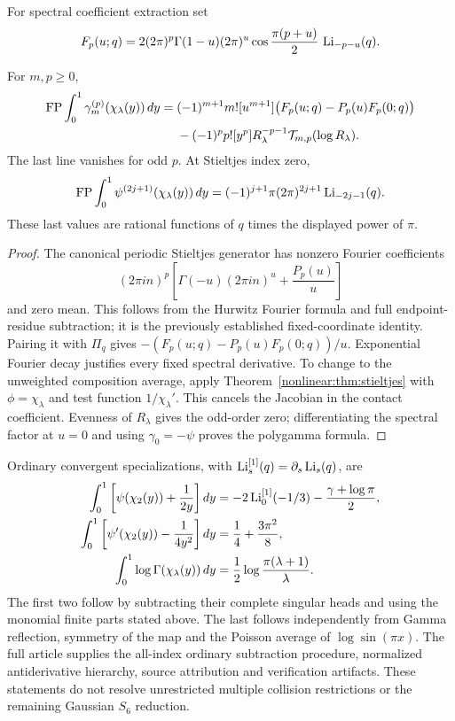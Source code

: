 For spectral coefficient extraction set
\[
F_p(u;q)=2(2\pi)^p\Gamma(1-u)(2\pi)^u
\cos\frac{\pi(p+u)}2\,\operatorname{Li}_{-p-u}(q).
\]
\begin{nonlinearthm}
\label{nonlinear:thm:circle}
For $m,p\ge0$,
\begin{align*}
\operatorname{FP}\int_0^1\gamma_m^{(p)}(\chi_\lambda(y))\,dy
={}&(-1)^{m+1}m![u^{m+1}]
\bigl(F_p(u;q)-P_p(u)F_p(0;q)\bigr)\\
&-(-1)^pp![y^p]R_\lambda^{-p-1}
\mathcal T_{m,p}(\log R_\lambda).
\end{align*}
The last line vanishes for odd $p$. At Stieltjes index zero,
\[
\operatorname{FP}\int_0^1\psi^{(2j+1)}(\chi_\lambda(y))\,dy
=(-1)^{j+1}\pi(2\pi)^{2j+1}\operatorname{Li}_{-2j-1}(q).
\]
These last values are rational functions of $q$ times the displayed power
of $\pi$.
\end{nonlinearthm}
\begin{proof}
The canonical periodic Stieltjes generator has nonzero Fourier coefficients
\[
(2\pi i n)^p\left[\Gamma(-u)(2\pi i n)^u+\frac{P_p(u)}u\right]
\]
and zero mean. This follows from the Hurwitz Fourier formula and full
endpoint-residue subtraction; it is the previously established
fixed-coordinate identity. Pairing it with $\Pi_q$ gives
$-(F_p(u;q)-P_p(u)F_p(0;q))/u$. Exponential Fourier decay justifies every
fixed spectral derivative. To change to the unweighted composition
average, apply Theorem~\ref{nonlinear:thm:stieltjes} with
$\phi=\chi_\lambda$ and test function $1/\chi_\lambda'$.
This cancels the Jacobian in the contact coefficient. Evenness of
$R_\lambda$ gives the odd-order zero; differentiating the spectral factor
at $u=0$ and using $\gamma_0=-\psi$ proves the polygamma formula.
\end{proof}

Ordinary convergent specializations, with
$\operatorname{Li}_s^{[1]}(q)=\partial_s\operatorname{Li}_s(q)$, are
\begin{align*}
\int_0^1\left[\psi(\chi_2(y))+\frac1{2y}\right]dy
&=-2\operatorname{Li}_0^{[1]}(-1/3)-\frac{\gamma+\log\pi}{2},\\
\int_0^1\left[\psi'(\chi_2(y))-\frac1{4y^2}\right]dy
&=\frac14+\frac{3\pi^2}{8},\\
\int_0^1\log\Gamma(\chi_\lambda(y))\,dy
&=\frac12\log\frac{\pi(\lambda+1)}\lambda.
\end{align*}
The first two follow by subtracting their complete singular heads and using
the monomial finite parts stated above. The last follows independently
from Gamma reflection, symmetry of the map and the Poisson average of
$\log\sin(\pi x)$. The full article supplies the all-index ordinary
subtraction procedure, normalized antiderivative hierarchy, source
attribution and verification artifacts. These statements do not resolve
unrestricted multiple collision restrictions or the remaining Gaussian
$S_6$ reduction.

